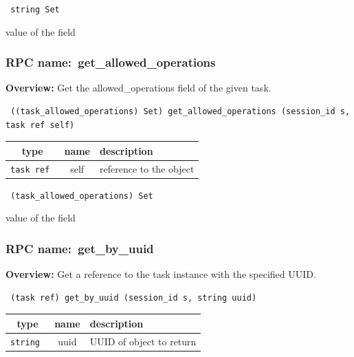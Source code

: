 \vspace{0.3cm}

{\tt 
string Set
}


value of the field
\vspace{0.3cm}
\vspace{0.3cm}
\vspace{0.3cm}
\subsubsection{RPC name:~get\_allowed\_operations}

{\bf Overview:} 
Get the allowed\_operations field of the given task.

\begin{verbatim} ((task_allowed_operations) Set) get_allowed_operations (session_id s, task ref self)\end{verbatim}



 
\vspace{0.3cm}
\begin{tabular}{|c|c|p{7cm}|}
 \hline
{\bf type} & {\bf name} & {\bf description} \\ \hline
{\tt task ref } & self & reference to the object \\ \hline 

\end{tabular}

\vspace{0.3cm}

{\tt 
(task\_allowed\_operations) Set
}


value of the field
\vspace{0.3cm}
\vspace{0.3cm}
\vspace{0.3cm}
\subsubsection{RPC name:~get\_by\_uuid}

{\bf Overview:} 
Get a reference to the task instance with the specified UUID.

\begin{verbatim} (task ref) get_by_uuid (session_id s, string uuid)\end{verbatim}



 
\vspace{0.3cm}
\begin{tabular}{|c|c|p{7cm}|}
 \hline
{\bf type} & {\bf name} & {\bf description} \\ \hline
{\tt string } & uuid & UUID of object to return \\ \hline 

\end{tabular}

